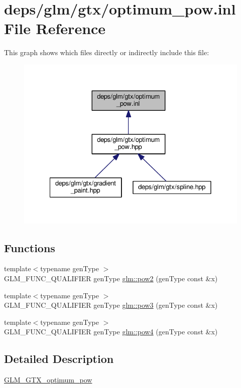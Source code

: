\hypertarget{optimum__pow_8inl}{}\section{deps/glm/gtx/optimum\+\_\+pow.inl File Reference}
\label{optimum__pow_8inl}
This graph shows which files directly or indirectly include this file\+:
\nopagebreak
\begin{figure}[H]
\begin{center}
\leavevmode
\includegraphics[width=328pt]{da/d6e/optimum__pow_8inl__dep__incl}
\end{center}
\end{figure}
\subsection*{Functions}
\begin{DoxyCompactItemize}
\item 
{\footnotesize template$<$typename gen\+Type $>$ }\\G\+L\+M\+\_\+\+F\+U\+N\+C\+\_\+\+Q\+U\+A\+L\+I\+F\+I\+ER gen\+Type \hyperlink{group__gtx__optimum__pow_ga19aaff3213bf23bdec3ef124ace237e9}{glm\+::pow2} (gen\+Type const \&x)
\item 
{\footnotesize template$<$typename gen\+Type $>$ }\\G\+L\+M\+\_\+\+F\+U\+N\+C\+\_\+\+Q\+U\+A\+L\+I\+F\+I\+ER gen\+Type \hyperlink{group__gtx__optimum__pow_ga35689d03cd434d6ea819f1942d3bf82e}{glm\+::pow3} (gen\+Type const \&x)
\item 
{\footnotesize template$<$typename gen\+Type $>$ }\\G\+L\+M\+\_\+\+F\+U\+N\+C\+\_\+\+Q\+U\+A\+L\+I\+F\+I\+ER gen\+Type \hyperlink{group__gtx__optimum__pow_gacef0968763026e180e53e735007dbf5a}{glm\+::pow4} (gen\+Type const \&x)
\end{DoxyCompactItemize}


\subsection{Detailed Description}
\hyperlink{group__gtx__optimum__pow}{G\+L\+M\+\_\+\+G\+T\+X\+\_\+optimum\+\_\+pow} 